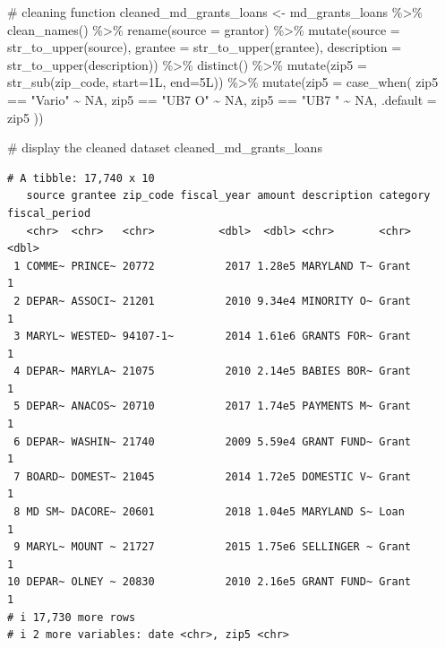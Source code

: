\documentclass[
  letterpaper,
  DIV=11,
  numbers=noendperiod]{scrreprt}
\newenvironment{Shaded}{\begin{snugshade}}{\end{snugshade}}
\newcommand{\AttributeTok}[1]{\textcolor[rgb]{0.40,0.45,0.13}{#1}}
\newcommand{\CommentTok}[1]{\textcolor[rgb]{0.37,0.37,0.37}{#1}}
\newcommand{\ConstantTok}[1]{\textcolor[rgb]{0.56,0.35,0.01}{#1}}
\newcommand{\FunctionTok}[1]{\textcolor[rgb]{0.28,0.35,0.67}{#1}}
\newcommand{\NormalTok}[1]{\textcolor[rgb]{0.00,0.23,0.31}{#1}}
\newcommand{\OtherTok}[1]{\textcolor[rgb]{0.00,0.23,0.31}{#1}}
\newcommand{\SpecialCharTok}[1]{\textcolor[rgb]{0.37,0.37,0.37}{#1}}
\newcommand{\StringTok}[1]{\textcolor[rgb]{0.13,0.47,0.30}{#1}}
\begin{document}
\begin{Shaded}
\begin{Highlighting}[]
\CommentTok{\# cleaning function}
\NormalTok{cleaned\_md\_grants\_loans }\OtherTok{\textless{}{-}}\NormalTok{ md\_grants\_loans }\SpecialCharTok{\%\textgreater{}\%}
  \FunctionTok{clean\_names}\NormalTok{() }\SpecialCharTok{\%\textgreater{}\%} 
  \FunctionTok{rename}\NormalTok{(}\AttributeTok{source =}\NormalTok{ grantor) }\SpecialCharTok{\%\textgreater{}\%} 
  \FunctionTok{mutate}\NormalTok{(}\AttributeTok{source =} \FunctionTok{str\_to\_upper}\NormalTok{(source), }\AttributeTok{grantee =} \FunctionTok{str\_to\_upper}\NormalTok{(grantee), }\AttributeTok{description =} \FunctionTok{str\_to\_upper}\NormalTok{(description)) }\SpecialCharTok{\%\textgreater{}\%} 
  \FunctionTok{distinct}\NormalTok{() }\SpecialCharTok{\%\textgreater{}\%}
  \FunctionTok{mutate}\NormalTok{(}\AttributeTok{zip5 =} \FunctionTok{str\_sub}\NormalTok{(zip\_code, }\AttributeTok{start=}\NormalTok{1L, }\AttributeTok{end=}\NormalTok{5L)) }\SpecialCharTok{\%\textgreater{}\%}
  \FunctionTok{mutate}\NormalTok{(}\AttributeTok{zip5 =} \FunctionTok{case\_when}\NormalTok{(}
\NormalTok{    zip5 }\SpecialCharTok{==} \StringTok{"Vario"} \SpecialCharTok{\textasciitilde{}} \ConstantTok{NA}\NormalTok{,}
\NormalTok{    zip5 }\SpecialCharTok{==} \StringTok{"UB7 O"} \SpecialCharTok{\textasciitilde{}} \ConstantTok{NA}\NormalTok{,}
\NormalTok{    zip5 }\SpecialCharTok{==} \StringTok{"UB7 "} \SpecialCharTok{\textasciitilde{}} \ConstantTok{NA}\NormalTok{,}
    \AttributeTok{.default =}\NormalTok{ zip5}
\NormalTok{  ))}

\CommentTok{\# display the cleaned dataset}
\NormalTok{cleaned\_md\_grants\_loans}
\end{Highlighting}
\end{Shaded}

\begin{verbatim}
# A tibble: 17,740 x 10
   source grantee zip_code fiscal_year amount description category fiscal_period
   <chr>  <chr>   <chr>          <dbl>  <dbl> <chr>       <chr>            <dbl>
 1 COMME~ PRINCE~ 20772           2017 1.28e5 MARYLAND T~ Grant                1
 2 DEPAR~ ASSOCI~ 21201           2010 9.34e4 MINORITY O~ Grant                1
 3 MARYL~ WESTED~ 94107-1~        2014 1.61e6 GRANTS FOR~ Grant                1
 4 DEPAR~ MARYLA~ 21075           2010 2.14e5 BABIES BOR~ Grant                1
 5 DEPAR~ ANACOS~ 20710           2017 1.74e5 PAYMENTS M~ Grant                1
 6 DEPAR~ WASHIN~ 21740           2009 5.59e4 GRANT FUND~ Grant                1
 7 BOARD~ DOMEST~ 21045           2014 1.72e5 DOMESTIC V~ Grant                1
 8 MD SM~ DACORE~ 20601           2018 1.04e5 MARYLAND S~ Loan                 1
 9 MARYL~ MOUNT ~ 21727           2015 1.75e6 SELLINGER ~ Grant                1
10 DEPAR~ OLNEY ~ 20830           2010 2.16e5 GRANT FUND~ Grant                1
# i 17,730 more rows
# i 2 more variables: date <chr>, zip5 <chr>
\end{verbatim}
\end{document}
